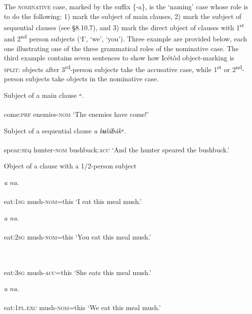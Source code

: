 The \textsc{nominative} case, marked by the suffix \{-a\}, is the ‘naming’ case whose role is to do the following: 1) mark the subject of main clauses, 2) mark the subject of sequential clauses (see §8.10.7), and 3) mark the direct object of clauses with 1\textsuperscript{st} and 2\textsuperscript{nd} person subjects (‘I’, ‘we’, ‘you’). Three example are provided below, each one illustrating one of the three grammatical roles of the nominative case. The third example contains seven sentences to show how Icétôd object-marking is \textsc{split}: objects after 3\textsuperscript{rd}{}-person subjects take the accusative case, while 1\textsuperscript{st} or 2\textsuperscript{nd}{}-person subjects take objects in the nominative case.




Subject of a main clause
\ea\label{ex:}
\textit{ᵃ}. \\
    \\
come:\textsc{prf}   enemies-\textsc{nom}
\glt ‘The enemies have come!’ 
\z




Subject of a sequential clause
\ea\label{ex:}
\textit{a}\textit{   kʉláɓákᵃ.} \\
    \\
spear:\textsc{seq}   hunter-\textsc{nom}   bushbuck:\textsc{acc}
\glt ‘And the hunter speared the bushbuck.’ 
\z




Object of a clause with a 1/2-person subject




\ea\label{ex:}
\textit{a}\textit{ na.} \\
    \\
eat:\textsc{1sg}   mush-\textsc{nom}=this
\glt ‘I eat this meal mush.’ 
\z




\ea\label{ex:}
\textit{a}\textit{ na.} \\
    \\
eat:\textsc{2sg}   mush-\textsc{nom}=this
\glt ‘You eat this meal mush.’ 
\z




\ea\label{ex:}
 \\
    \\
eat:\textsc{3sg}   mush-\textsc{acc}=this
\glt ‘She eats this meal mush.’ 
\z




\ea\label{ex:}
\textit{a}\textit{ na.} \\
    \\
eat:\textsc{1pl.exc}   mush-\textsc{nom}=this
\glt ‘We eat this meal mush.’ 
\z





